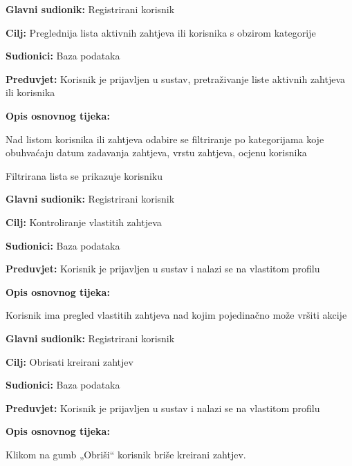 \noindent {}
\begin{packed_item}
	\item \textbf{Glavni sudionik: } Registrirani korisnik
	\item  \textbf{Cilj:} Preglednija lista aktivnih zahtjeva ili korisnika s obzirom kategorije 
	\item  \textbf{Sudionici:} Baza podataka
	\item  \textbf{Preduvjet:} Korisnik je prijavljen u sustav, pretraživanje liste aktivnih zahtjeva ili korisnika
	\item  \textbf{Opis osnovnog tijeka:}
	\item[] \begin{packed_enum}
		\item Nad listom korisnika ili zahtjeva odabire se filtriranje po kategorijama koje obuhvaćaju datum zadavanja zahtjeva, vrstu zahtjeva, ocjenu korisnika
		\item Filtrirana lista se prikazuje korisniku
	\end{packed_enum}
\end{packed_item}

\noindent {}
\begin{packed_item}
	\item \textbf{Glavni sudionik: }Registrirani korisnik
	\item  \textbf{Cilj:} Kontroliranje vlastitih zahtjeva
	\item  \textbf{Sudionici:} Baza podataka
	\item  \textbf{Preduvjet:} Korisnik je prijavljen u sustav i nalazi se na vlastitom profilu
	\item  \textbf{Opis osnovnog tijeka:}
	\item[] \begin{packed_enum}
		\item 	Korisnik ima pregled  vlastitih zahtjeva nad kojim pojedinačno može vršiti akcije 
	\end{packed_enum}
\end{packed_item}

\noindent {}
\begin{packed_item}
	\item \textbf{Glavni sudionik: }Registrirani korisnik
	\item  \textbf{Cilj:} Obrisati kreirani zahtjev
	\item  \textbf{Sudionici:} Baza podataka
	\item  \textbf{Preduvjet:} Korisnik je prijavljen u sustav i nalazi se na vlastitom profilu
	\item  \textbf{Opis osnovnog tijeka:}
	\item[] \begin{packed_enum}
		\item 	Klikom na gumb „Obriši“ korisnik briše kreirani zahtjev. 
	\end{packed_enum}
\end{packed_item}

